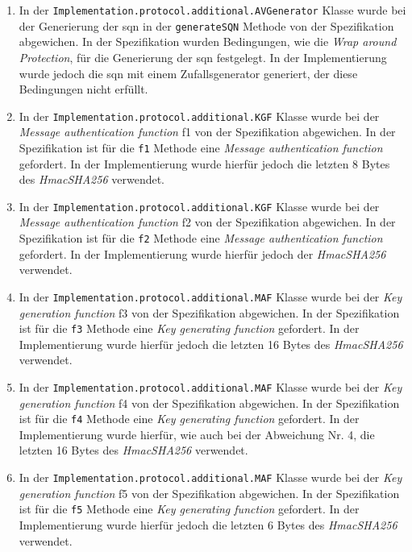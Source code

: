 \begin{enumerate}
\item In der \lstinline{Implementation.protocol.additional.AVGenerator} Klasse wurde bei der Generierung der \gls{sqn} in der \lstinline{generateSQN} Methode von der Spezifikation abgewichen.
In der Spezifikation wurden Bedingungen, wie die \textit{Wrap around Protection}, für die Generierung der \gls{sqn} festgelegt.
In der Implementierung wurde jedoch die \gls{sqn} mit einem Zufallsgenerator generiert, der diese Bedingungen nicht erfüllt.

\item In der \lstinline{Implementation.protocol.additional.KGF} Klasse wurde bei der \textit{Message authentication function} f1 von der Spezifikation abgewichen.
In der Spezifikation ist für die \lstinline{f1} Methode eine \textit{Message authentication function} gefordert.
In der Implementierung wurde hierfür jedoch die letzten 8 Bytes des \textit{HmacSHA256} verwendet.

\item In der \lstinline{Implementation.protocol.additional.KGF} Klasse wurde bei der \textit{Message authentication function} f2 von der Spezifikation abgewichen.
In der Spezifikation ist für die \lstinline{f2} Methode eine \textit{Message authentication function} gefordert.
In der Implementierung wurde hierfür jedoch der \textit{HmacSHA256} verwendet.

\item In der \lstinline{Implementation.protocol.additional.MAF} Klasse wurde bei der \textit{Key generation function} f3 von der Spezifikation abgewichen.
In der Spezifikation ist für die \lstinline{f3} Methode eine \textit{Key generating function} gefordert.
In der Implementierung wurde hierfür jedoch die letzten 16 Bytes des \textit{HmacSHA256} verwendet.

\item In der \lstinline{Implementation.protocol.additional.MAF} Klasse wurde bei der \textit{Key generation function} f4 von der Spezifikation abgewichen.
In der Spezifikation ist für die \lstinline{f4} Methode eine \textit{Key generating function} gefordert.
In der Implementierung wurde hierfür, wie auch bei der Abweichung Nr. 4, die letzten 16 Bytes des \textit{HmacSHA256} verwendet.

\item In der \lstinline{Implementation.protocol.additional.MAF} Klasse wurde bei der \textit{Key generation function} f5 von der Spezifikation abgewichen.
In der Spezifikation ist für die \lstinline{f5} Methode eine \textit{Key generating function} gefordert.
In der Implementierung wurde hierfür jedoch die letzten 6 Bytes des \textit{HmacSHA256} verwendet.


\end{enumerate}
